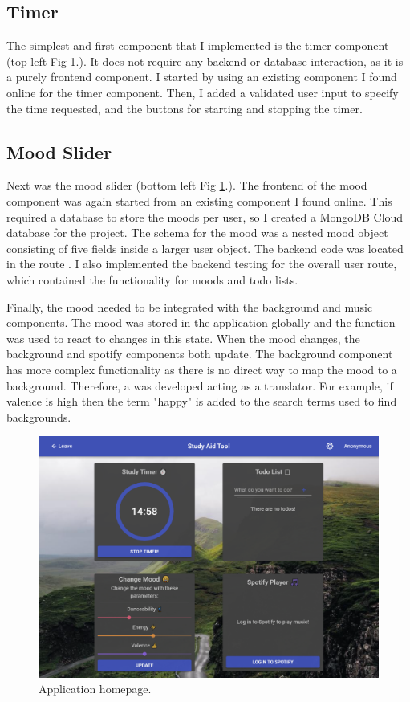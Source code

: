 \documentclass[conference]{IEEEtran}
\begin{document}
\subsection{Timer}
The simplest and first component that I implemented is the timer component (top left Fig \ref{homepage}.). It does not require any backend or database interaction, as it is a purely frontend component. I started by using an existing component I found online for the timer component. Then, I added a validated user input to specify the time requested, and the buttons for starting and stopping the timer.

\subsection{Mood Slider}
Next was the mood slider (bottom left Fig \ref{homepage}.). The frontend of the mood component was again started from an existing component I found online. This required a database to store the moods per user, so I created a MongoDB Cloud database for the project. The schema for the mood was a nested mood object consisting of five fields inside a larger user object. The backend code was located in the route . I also implemented the backend testing for the overall user route, which contained the functionality for moods and todo lists.

Finally, the mood needed to be integrated with the background and music components. The mood was stored in the application globally and the  function was used to react to changes in this state. When the mood changes, the background and spotify components both update. The background component has more complex functionality as there is no direct way to map the mood to a background. Therefore, a  was developed acting as a translator. For example, if valence is high then the term "happy" is added to the search terms used to find backgrounds.

\begin{figure}[htbp]
\centerline{\includegraphics[width = \linewidth]{homepage.png}}
\caption{Application homepage.}
\label{homepage}
\end{figure}
\end{document}
